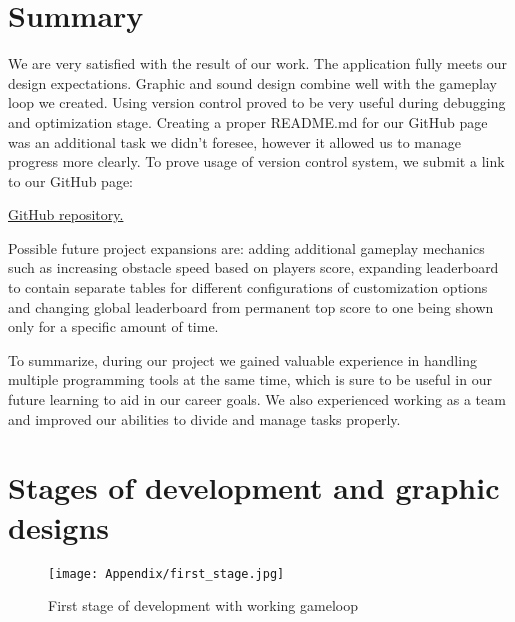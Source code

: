 \documentclass[oneside,a4paper,11pt]{report}
\begin{document}
\chapter{Summary}
We are very satisfied with the result of our work. The application fully meets our design expectations. Graphic and sound design combine well with the gameplay loop we created. Using version control proved to be very useful during debugging and optimization stage. Creating a proper README.md for our GitHub page was an additional task we didn’t foresee, however it allowed us to manage progress more clearly. To prove usage of version control system, we submit a link to our GitHub page:

\underline{\href{https://github.com/RadziooT/Cyberventure}{GitHub repository}.} 

\hfill

\par
Possible future project expansions are: adding additional gameplay mechanics such as increasing obstacle speed based on players score, expanding leaderboard to contain separate tables for different configurations of customization options and changing global leaderboard from permanent top score to one being shown only for a specific amount of time.

\par
To summarize, during our project we gained valuable experience in handling multiple programming tools at the same time, which is sure to be useful in our future learning to aid in our career goals. We also experienced working as a team and improved our abilities to divide and manage tasks properly. 


\newpage
{}
{}



\newpage
\newpage
{}

\appendix
\chapter{Stages of development and graphic designs}

\begin{figure}[!htb]
	\centering
	\texttt{[image: Appendix/first\_stage.jpg]}
	\caption{First stage of development with working gameloop}
\end{figure}
\end{document}
